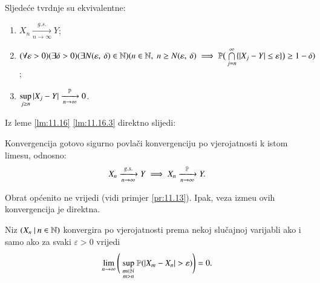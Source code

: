 \begin{lm}  \label{lm:11.16}
    Sljede\' ce tvrdnje su ekvivalentne:
    \begin{enumerate}[label=(\roman*)]
        \item $X_n \xrightarrow[n \to \infty]{g.s.} Y$;
        \item $(\forall \varepsilon > 0)(\exists \delta > 0) (\exists N ({\varepsilon}, \: {\delta}) \in \mathbb{N})\\
        (n \in \mathbb{N}, \; n \geq N ({\varepsilon}, \: {\delta}) \implies \mathbb{P} \big( \bigcap\limits_{j = n}^{\infty} \{ |X_j - Y| \leq \varepsilon \} \big) \geq 1 - \delta)$;
        \item   \label{lm:11.16.3}
        $\sup\limits_{j \geq n} |X_j - Y| \xrightarrow[n  \to \infty]{\mathbb{P}} 0$.
    \end{enumerate}
\end{lm}
 Iz leme \ref{lm:11.16} \ref{lm:11.16.3} direktno slijedi:

\begin{kor}    \label{kor:11.17}
    Konvergencija gotovo sigurno povla\v ci konvergenciju po vjerojatnosti k istom limesu, odnosno:
    \begin{equation*}
        X_n \xrightarrow[n \to \infty]{g.s.} Y \implies X_n \xrightarrow[n \to \infty]{\mathbb{P}} Y.
    \end{equation*}
\end{kor}

Obrat op\' cenito ne vrijedi (vidi primjer \ref{pr:11.13}).
Ipak, veza izme\dj u ovih konvergencija je direktna.
 
\begin{lm} \label{lm:11.18}
    Niz $({X_n} \: | \: {n \in \mathbb{N}})$ konvergira po vjerojatnosti prema nekoj slu\v cajnoj varijabli ako i samo ako za svaki $\varepsilon > 0$ vrijedi
    \begin{equation*}
        \lim\limits_{n \to \infty} \Bigg( \sup\limits_{
            \begin{smallmatrix}
               m \in \mathbb{N}\\
               m > n
            \end{smallmatrix}
        }  \mathbb{P}({ |X_m - X_n| > \varepsilon })\Bigg) = 0.
    \end{equation*}
\end{lm}

